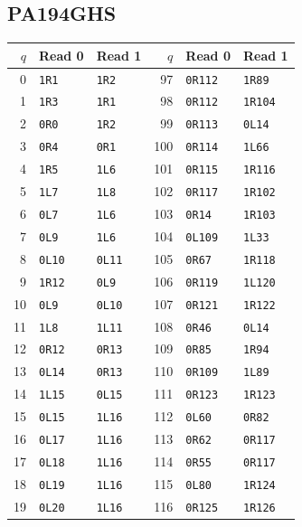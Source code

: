 \subsection{PA194GHS}
{\small
\begin{longtable}{@{}rll@{\qquad\quad}rll@{}}
\toprule $q$ & Read 0 & Read 1 & $q$ & Read 0 & Read 1\\
\midrule\endhead
0 & \texttt{1R1} & \texttt{1R2} & 97 & \texttt{0R112} & \texttt{1R89}\\
1 & \texttt{1R3} & \texttt{1R1} & 98 & \texttt{0R112} & \texttt{1R104}\\
2 & \texttt{0R0} & \texttt{1R2} & 99 & \texttt{0R113} & \texttt{0L14}\\
3 & \texttt{0R4} & \texttt{0R1} & 100 & \texttt{0R114} & \texttt{1L66}\\
4 & \texttt{1R5} & \texttt{1L6} & 101 & \texttt{0R115} & \texttt{1R116}\\
5 & \texttt{1L7} & \texttt{1L8} & 102 & \texttt{0R117} & \texttt{1R102}\\
6 & \texttt{0L7} & \texttt{1L6} & 103 & \texttt{0R14} & \texttt{1R103}\\
7 & \texttt{0L9} & \texttt{1L6} & 104 & \texttt{0L109} & \texttt{1L33}\\
8 & \texttt{0L10} & \texttt{0L11} & 105 & \texttt{0R67} & \texttt{1R118}\\
9 & \texttt{1R12} & \texttt{0L9} & 106 & \texttt{0R119} & \texttt{1L120}\\
10 & \texttt{0L9} & \texttt{0L10} & 107 & \texttt{0R121} & \texttt{1R122}\\
11 & \texttt{1L8} & \texttt{1L11} & 108 & \texttt{0R46} & \texttt{0L14}\\
12 & \texttt{0R12} & \texttt{0R13} & 109 & \texttt{0R85} & \texttt{1R94}\\
13 & \texttt{0L14} & \texttt{0R13} & 110 & \texttt{0R109} & \texttt{1L89}\\
14 & \texttt{1L15} & \texttt{0L15} & 111 & \texttt{0R123} & \texttt{1R123}\\
15 & \texttt{0L15} & \texttt{1L16} & 112 & \texttt{0L60} & \texttt{0R82}\\
16 & \texttt{0L17} & \texttt{1L16} & 113 & \texttt{0R62} & \texttt{0R117}\\
17 & \texttt{0L18} & \texttt{1L16} & 114 & \texttt{0R55} & \texttt{0R117}\\
18 & \texttt{0L19} & \texttt{1L16} & 115 & \texttt{0L80} & \texttt{1R124}\\
19 & \texttt{0L20} & \texttt{1L16} & 116 & \texttt{0R125} & \texttt{1R126}\\

\end{longtable}}
